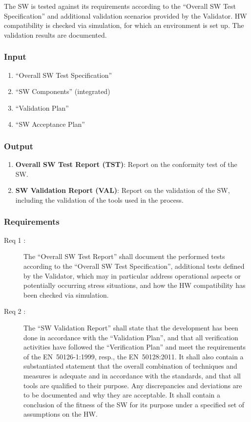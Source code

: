 \documentclass{template/openetcs_article}
\begin{document}
The SW is tested against its requirements according to the
``Overall SW Test Specification'' and additional validation scenarios
provided by the Validator. HW compatibility is checked via simulation, for which an
environment is set up. The validation results are documented.

\subsubsection{Input}
\label{sec:7-input}

\begin{enumerate}
\item ``Overall SW Test Specification''
\item ``SW Components'' (integrated)
\item ``Validation Plan''
\item ``SW Acceptance Plan''
\end{enumerate}

\subsubsection{Output}
\label{sec:7-output}

\begin{enumerate}
\item \textbf{Overall SW Test Report (TST)}: Report on the conformity
  test of the SW.
\item \textbf{SW Validation Report (VAL)}: Report on the validation of
  the SW, including the validation of the tools used in the process.
\end{enumerate}

\subsubsection{Requirements}
\label{sec:7-requirements}

\begin{description}
\item[Req 1 {\cite[7.7.4.1 to 7.7.4.4]{EN50128:2011}}:] The ``Overall
  SW Test Report'' shall document the performed tests according to the
  ``Overall SW Test Specification'', additional tests defined by the
  Validator, which may in particular address operational aspects or potentially
  occurring stress situations, and how the HW compatibility has been
  checked via simulation.
\item[Req 2 {\cite[7.7.4.6 to 7.7.4.11]{EN50128:2011}}:] The ``SW
  Validation Report'' shall state that the development has been done
  in accordance with the ``Validation Plan'', and that all
  verification activities have followed the ``Verification Plan'' and
  meet the requirements of the EN~50126-1:1999, resp., the
  EN~50128:2011. It shall also contain a substantiated statement that
  the overall combination of techniques and measures is adequate and
  in accordance with the standards, and that all tools are qualified
  to their purpose. Any discrepancies and deviations are to be
  documented and why they are acceptable. It shall contain a
  conclusion of the fitness of the SW for its purpose under a
  specified set of assumptions on the HW.
\end{description}
\end{document}
